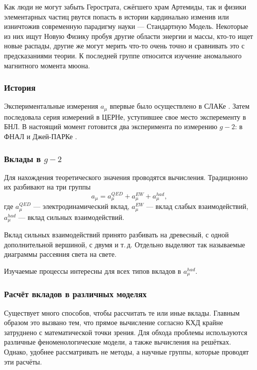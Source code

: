 Как люди не могут забыть Герострата, сжёгшего храм Артемиды, так и физики
элементарных частиц рвутся попасть в истории кардинально изменив или
изничтожив современную парадигму науки --- Стандартную Модель. Некоторые
из них ищут Новую Физику пробуя другие области энергии и массы, кто-то
ищет новые распады, другие же могут мерить что-то очень точно и
сравнивать это с предсказаниями теории. К последней группе относится
изучение аномального магнитного момента мюона.

\subsubsection{История}\label{g-2-history}

Экспериментальные измерения $a_\mu$ впервые было осуществлено в СЛАКе \cite{Garwin:1960zz}.
Затем последовала серия измерений в ЦЕРНе, уступившее свое место эксперементу в БНЛ.
В настоящий момент готовится два эксперимента по измерению $g-2$: в ФНАЛ \cite{Grange:2015fou} и Джей-ПАРКе \cite{Saito:2012zz}.

\subsubsection{Вклады в $g-2$}
\label{contribution-to-g-2}

Для нахождения теоретического значения проводятся вычисления.
Традиционно их разбивают на три группы
\begin{equation}
    a_\mu = a_\mu^{QED} + a_\mu^{EW} + a_\mu^{had},
\end{equation}
где $a_\mu^{QED}$ --- электродинамический вклад, $a_\mu^{EW}$ --- вклад
слабых взаимодействий, $a_\mu^{had}$ --- вклад сильных взаимодействий.

Вклад сильных взаимодействий принято разбивать на древесный, с одной
дополнительной вершиной, с двумя и т.\,д.
Отдельно выделяют так называемые
диаграммы рассеяния света на свете.

Изучаемые процессы интересны для всех типов вкладов в $a_\mu^{had}$. 

\subsubsection{Расчёт вкладов в различных
моделях}\label{contribution-calculation}

Существует много способов, чтобы рассчитать те или иные вклады. Главным
образом это вызвано тем, что прямое вычисление согласно КХД крайне
затруднено с математической точки зрения. Для обхода проблемы
используются различные феноменологические модели, а также вычисления на
решётках. Однако, удобнее рассматривать не методы, а научные группы,
которые проводят эти расчёты.


